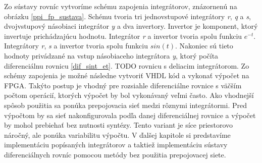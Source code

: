 Zo sústavy rovníc vytvoríme schému zapojenia integrátorov, znázornenú na obrázku \ref{ppi_fp_sustava}. Schému tvoria tri jednovstupové integrátory \textit{r}, \textit{q} a \textit{s}, dvojvstupový násobiaci integrátor \textit{y} a dva invertory. Invertor je komponent, ktorý invertuje prichádzajúcu hodnotu. Integrátor \textit{r} a invertor tvoria spolu funkciu $ e^{-t} $. Integrátory \textit{r}, \textit{s} a invertor tvoria spolu funkciu $ sin(t) $. Nakoniec sú tieto hodnoty privádzané na vstup násobiaceho integrátora \textit{y}, ktorý počíta diferenciálnu rovnicu \ref{dif_sint_et}.
TODO rovnicu s deliacim integrátorom.
Zo schémy zapojenia je možné následne vytvoriť VHDL kód a vykonať výpočet na FPGA. Takýto postup je vhodný pre rozsiahle diferenciálne rovnice s väčším počtom operácií, ktorých výpočet by bol vykonávaný veľmi často. Ako vhodnejší spôsob použitia sa ponúka prepojovacia sieť medzi rôznymi integrátormi. Pred výpočtom by sa sieť nakonfigurovala podľa danej diferenciálnej rovnice a výpočet by mohol prebiehať bez nutnosti syntézy. Tento variant je síce priestorovo náročný, ale ponúka variabilitu výpočtu.
V ďalšej kapitole si predstavíme implementáciu popísaných integrátorov a taktiež implementáciu sústavy diferenciálnych rovníc pomocou metódy bez použitia prepojovacej siete.
\bigskip

